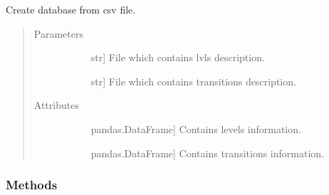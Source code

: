 \documentclass[letterpaper,10pt,english]{sphinxmanual}
\begin{document}
\begin{fulllineitems}
\label{\detokenize{nice_scheme_plotter:database_reader.Database_csv}}
Create database from csv file.
\begin{quote}\begin{description}
\item[{Parameters}] \leavevmode\begin{description}
\item[{}] \leavevmode{[}str{]}
File which contains lvls description.

\item[{}] \leavevmode{[}str{]}
File which contains transitions description.

\end{description}

\item[{Attributes}] \leavevmode\begin{description}
\item[{}] \leavevmode{[}pandas.DataFrame{]}
Contains levels information.

\item[{}] \leavevmode{[}pandas.DataFrame{]}
Contains transitions information.

\end{description}

\end{description}\end{quote}
\subsubsection*{Methods}


\begin{savenotes}\sphinxatlongtablestart\begin{longtable}{}
\hline

\endfirsthead

%
{}\\
\hline

\endhead

\hline
{}\\
\endfoot


\end{longtable}
\end{savenotes}
\end{fulllineitems}
\end{document}
